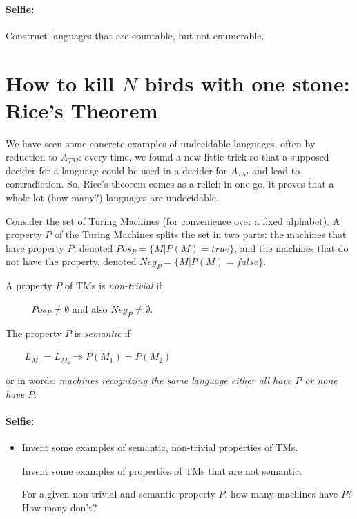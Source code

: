\paragraph{Selfie:} Construct languages that are countable, but not enumerable.

\section{How to kill $N$ birds with one stone: Rice's Theorem}

We have seen some concrete examples of undecidable languages, often by
reduction to $A_{TM}$: every time, we found a new little trick so that
a supposed decider for a language could be used in a decider for
$A_{TM}$ and lead to contradiction. So, Rice's theorem comes as a
relief: in one go, it proves that a whole lot (how many?) languages
are undecidable.

Consider the set of Turing Machines (for convenience over a fixed
alphabet). A property $P$ of the Turing Machines splits the set in two
parts: the machines that have property $P$, denoted
%
$Pos_P = \{M|P(M) = true\}$, and the machines that do not have the
property, denoted
%
$Neg_P = \{M|P(M) = false\}$.

\begin{definition}
A property $P$ of TMs is {\em non-trivial} if

$~~~~~~~~~~~~Pos_P \neq \emptyset$ and also $Neg_P \neq \emptyset$.
\end{definition}

\begin{definition}
The property $P$ is {\em semantic} if

$~~~~~~~~~L_{M_1} = L_{M_2} \Longrightarrow P(M_1) = P(M_2)$

or in words: {\em machines recognizing the same language either all
  have $P$ or none have $P$}.
\end{definition}

\paragraph{Selfie:}
\begin{itemize}
\item[]
Invent some examples of semantic, non-trivial
properties of TMs.

Invent some examples of properties of TMs that are not semantic.

For a given non-trivial and semantic property $P$, how many
machines have $P$? How many don't?
\end{itemize}

